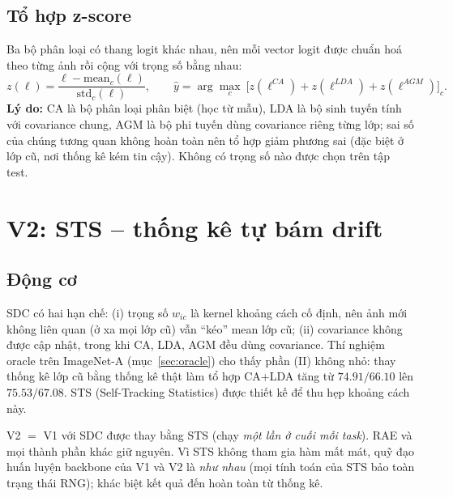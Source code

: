 \documentclass[11pt]{article}
\begin{document}
\subsection{Tổ hợp z-score}
Ba bộ phân loại có thang logit khác nhau, nên mỗi vector logit được chuẩn hoá theo từng ảnh rồi cộng với trọng số bằng
nhau:
\begin{equation}
 z(\ell)=\frac{\ell-\mathrm{mean}_c(\ell)}{\mathrm{std}_c(\ell)},\qquad
 \hat y=\arg\max_c\ \big[z(\ell^{CA})+z(\ell^{LDA})+z(\ell^{AGM})\big]_c .
\end{equation}
\textbf{Lý do:} CA là bộ phân loại phân biệt (học từ mẫu), LDA là bộ sinh tuyến tính với covariance chung, AGM là bộ
phi tuyến dùng covariance riêng từng lớp; sai số của chúng tương quan không hoàn toàn nên tổ hợp giảm phương sai (đặc
biệt ở lớp cũ, nơi thống kê kém tin cậy). Không có trọng số nào được chọn trên tập test.

\section{V2: STS -- thống kê tự bám drift}\label{sec:v2}

\subsection{Động cơ}
SDC có hai hạn chế: (i) trọng số $w_{ic}$ là kernel khoảng cách cố định, nên ảnh mới không liên quan (ở xa mọi lớp cũ)
vẫn ``kéo'' mean lớp cũ; (ii) covariance không được cập nhật, trong khi CA, LDA, AGM đều dùng covariance. Thí nghiệm
oracle trên ImageNet-A (mục~\ref{sec:oracle}) cho thấy phần (II) không nhỏ: thay thống kê lớp cũ bằng thống kê thật
làm tổ hợp CA+LDA tăng từ $74.91/66.10$ lên $75.53/67.08$. STS (Self-Tracking Statistics) được thiết kế để thu hẹp
khoảng cách này.

V2 $=$ V1 với SDC được thay bằng STS (chạy \emph{một lần ở cuối mỗi task}). RAE và mọi thành phần khác giữ nguyên. Vì
STS không tham gia hàm mất mát, quỹ đạo huấn luyện backbone của V1 và V2 là \emph{như nhau} (mọi tính toán của STS bảo
toàn trạng thái RNG); khác biệt kết quả đến hoàn toàn từ thống kê.
\end{document}
